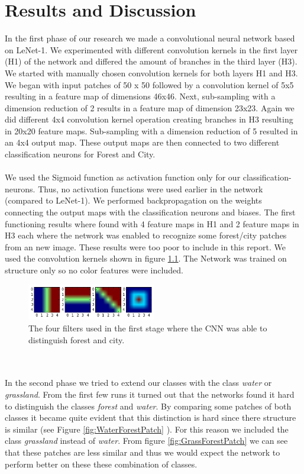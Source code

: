 \documentclass[a4paper,onecolumn]{report}
\begin{document}
\chapter{Results and Discussion}
\label{chap:resultsanddiscussion}
In the first phase of our research we made a convolutional neural network based on LeNet-1. We experimented with different convolution kernels in the first layer (H1) of the network and differed the amount of branches in the third layer (H3). We started with manually chosen convolution kernels for both layers H1 and H3. We began with input patches of 50 x 50 followed by a convolution kernel of 5x5 resulting in a feature map of dimensions 46x46. Next, sub-sampling with a dimension reduction of 2 results in a feature map of dimension 23x23. Again we did different 4x4 convolution kernel operation creating branches in H3 resulting in 20x20 feature maps. Sub-sampling with a dimension reduction of 5 resulted in an 4x4 output map. These output maps are then connected to two different classification neurons for Forest and City. \\\\
We used the Sigmoid function as activation function only for our classification-neurons. Thus, no activation functions were used earlier in the network (compared to LeNet-1). We performed backpropagation on the weights connecting the output maps with the classification neurons and biases. The first functioning results where found with 4 feature maps in H1 and 2 feature maps in H3 each where the network was enabled to recognize some forest/city patches from an new image. These results were too poor to include in this report. We used the convolution kernels shown in figure \ref{fig:firstFilters}. The Network was trained on structure only so no color features were included. 
\begin{figure}[bth!]
	\centering
	\includegraphics[width=0.5\textwidth]{./images/firstFilters.png}
	\caption{The four filters used in the first stage where the CNN was able to distinguish forest and city.}
	\label{fig:firstFilters}
\end{figure} 
\\\\
In the second phase we tried to extend our classes with the class \textit{water} or \textit{grassland}. From the first few runs it turned out that the networks found it hard to distinguish the classes \textit{forest} and \textit{water}. By comparing some patches of both classes it became quite evident that this distinction is hard since there structure is similar (see Figure \ref{fig:WaterForestPatch} ). For this reason we included the class \textit{grassland} instead of \textit{water}. From figure \ref{fig:GrassForestPatch} we can see that these patches are less similar and thus we would expect the network to perform better on these these combination of classes.
\end{document}
